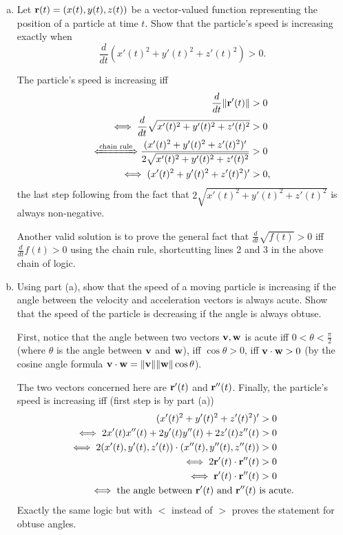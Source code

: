 \begin{problem}
  \leavevmode
  \begin{enumerate}[(a)]
    \item Let $\mathbf r(t)=(x(t),y(t),z(t))$ be a vector-valued function representing the position of a particle at time $t$. Show that the particle's speed is increasing exactly when
    \[\frac d{dt}(x'(t)^2+y'(t)^2+z'(t)^2)>0.\]
    \begin{solution}
      The particle's speed is increasing iff
      \begin{align*}
        \frac d{dt}\|\br'(t)\| &>0\\
        \iff\frac d{dt}\sqrt{x'(t)^2+y'(t)^2+z'(t)^2} &>0\\
        \xLeftrightarrow{\text{chain rule}}\frac{(x'(t)^2+y'(t)^2+z'(t)^2)'}{2\sqrt{x'(t)^2+y'(t)^2+z'(t)^2}} &>0\\
        \iff (x'(t)^2+y'(t)^2+z'(t)^2)'&>0,
      \end{align*}
      the last step following from the fact that $2\sqrt{x'(t)^2+y'(t)^2+z'(t)^2}$ is always non-negative.

      Another valid solution is to prove the general fact that $\frac d{dt}\sqrt{f(t)}>0$ iff $\frac d{dt}f(t)>0$ using the chain rule, shortcutting lines 2 and 3 in the above chain of logic.
    \end{solution}
    \item Using part (a), show that the speed of a moving particle is increasing if the angle between the velocity and acceleration vectors is always acute. Show that the speed of the particle is decreasing if the angle is always obtuse.
    \begin{solution}
      First, notice that the angle between two vectors $\mathbf v,\mathbf w$ is acute iff $0<\theta<\frac{\pi}2$ (where $\theta$ is the angle between $\mathbf v$ and $\mathbf w$), iff $\cos\theta>0$, iff $\mathbf v\cdot\mathbf w>0$ (by the cosine angle formula $\mathbf v\cdot\mathbf w=\|\mathbf v\|\|\mathbf w\|\cos\theta$).

      The two vectors concerned here are $\mathbf r'(t)$ and $\mathbf r''(t)$. Finally, the particle's speed is increasing iff (first step is by part (a))
      \begin{align*}
        (x'(t)^2+y'(t)^2+z'(t)^2)' &>0\\
        \iff 2x'(t)x''(t)+2y'(t)y''(t)+2z'(t)z''(t) &>0\\
        \iff 2(x'(t),y'(t),z'(t))\cdot(x''(t),y''(t),z''(t))&>0\\
        \iff 2\mathbf r'(t)\cdot\mathbf r''(t) &> 0\\
        \iff \mathbf r'(t)\cdot\mathbf r''(t) &> 0\\
        \iff\text{the angle between $\mathbf r'(t)$ and $\mathbf r''(t)$ }&\text{is acute}.
      \end{align*}
      Exactly the same logic but with $<$ instead of $>$ proves the statement for obtuse angles.


\end{solution}
\end{enumerate}
\end{problem}
